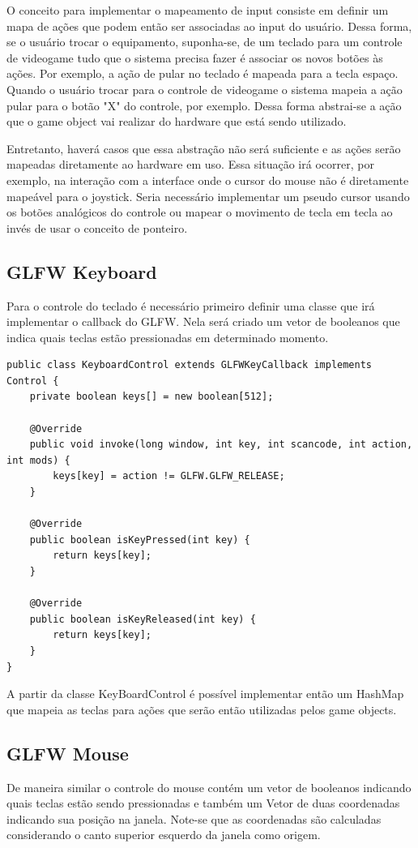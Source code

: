 \documentclass[12pt, 
openright, 
oneside, 
a4paper,    
brazil]{facom-ufu-abntex2}
\begin{document}
O conceito para implementar o mapeamento de input consiste em definir um mapa de ações que podem então ser associadas ao input do usuário. Dessa forma, se o usuário trocar o equipamento, suponha-se, de um teclado para um controle de videogame tudo que o sistema precisa fazer é associar os novos botões às ações. Por exemplo, a ação de pular no teclado é mapeada para a tecla espaço. Quando o usuário trocar para o controle de videogame o sistema mapeia a ação pular para o botão "X" do controle, por exemplo. Dessa forma abstrai-se a ação que o game object vai realizar do hardware que está sendo utilizado.

Entretanto, haverá casos que essa abstração não será suficiente e as ações serão mapeadas diretamente ao hardware em uso. Essa situação irá ocorrer, por exemplo, na interação com a interface onde o cursor do mouse não é diretamente mapeável para o joystick. Seria necessário implementar um pseudo cursor usando os botões analógicos do controle ou mapear o movimento de tecla em tecla ao invés de usar o conceito de ponteiro.

\subsection{GLFW Keyboard}
Para o controle do teclado é necessário primeiro definir uma classe que irá implementar o callback do GLFW. Nela será criado um vetor de booleanos que indica quais teclas estão pressionadas em determinado momento.

\begin{lstlisting}[caption=Keyboard input]
public class KeyboardControl extends GLFWKeyCallback implements  Control {
    private boolean keys[] = new boolean[512];
 
    @Override
    public void invoke(long window, int key, int scancode, int action, int mods) {
        keys[key] = action != GLFW.GLFW_RELEASE;
    }
 
    @Override
    public boolean isKeyPressed(int key) {
        return keys[key];
    }
 
    @Override
    public boolean isKeyReleased(int key) {
        return keys[key];
    }
}
\end{lstlisting}

A partir da classe KeyBoardControl é possível implementar então um HashMap que mapeia as teclas para ações que serão então utilizadas pelos game objects.


\subsection{GLFW Mouse}
De maneira similar o controle do mouse contém um vetor de booleanos indicando quais teclas estão sendo pressionadas e também um Vetor de duas coordenadas indicando sua posição na janela. Note-se que as coordenadas são calculadas considerando o canto superior esquerdo da janela como origem.
\end{document}
